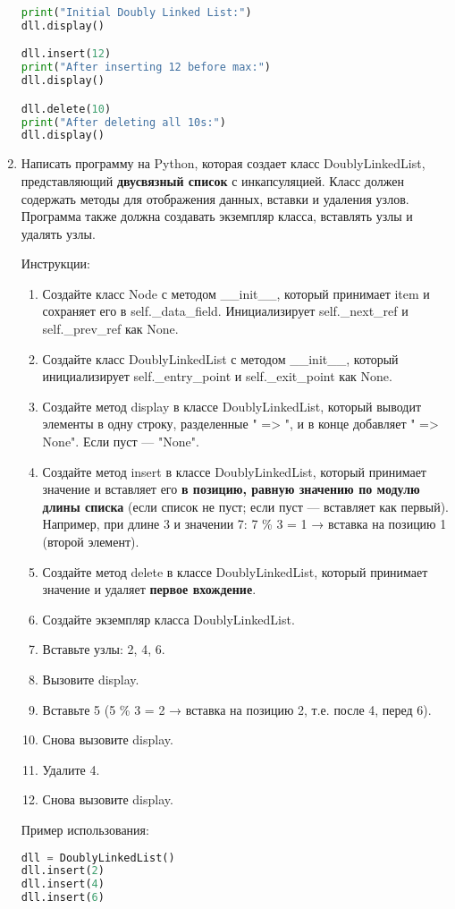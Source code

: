 \begin{enumerate}
\begin{lstlisting}[language=Python]
print("Initial Doubly Linked List:")
dll.display()

dll.insert(12)
print("After inserting 12 before max:")
dll.display()

dll.delete(10)
print("After deleting all 10s:")
dll.display()
\end{lstlisting}

\item Написать программу на Python, которая создает класс DoublyLinkedList, представляющий \textbf{двусвязный список} с инкапсуляцией. Класс должен содержать методы для отображения данных, вставки и удаления узлов. Программа также должна создавать экземпляр класса, вставлять узлы и удалять узлы.

Инструкции:
\begin{enumerate}
    \item Создайте класс Node с методом \_\_init\_\_, который принимает item и сохраняет его в self.\_data\_field. Инициализирует self.\_next\_ref и self.\_prev\_ref как None.
    \item Создайте класс DoublyLinkedList с методом \_\_init\_\_, который инициализирует self.\_entry\_point и self.\_exit\_point как None.
    \item Создайте метод display в классе DoublyLinkedList, который выводит элементы в одну строку, разделенные " => ", и в конце добавляет " => None". Если пуст — "None".
    \item Создайте метод insert в классе DoublyLinkedList, который принимает значение и вставляет его \textbf{в позицию, равную значению по модулю длины списка} (если список не пуст; если пуст — вставляет как первый). Например, при длине 3 и значении 7: 7 \% 3 = 1 → вставка на позицию 1 (второй элемент).
    \item Создайте метод delete в классе DoublyLinkedList, который принимает значение и удаляет \textbf{первое вхождение}.
    \item Создайте экземпляр класса DoublyLinkedList.
    \item Вставьте узлы: 2, 4, 6.
    \item Вызовите display.
    \item Вставьте 5 (5 \% 3 = 2 → вставка на позицию 2, т.е. после 4, перед 6).
    \item Снова вызовите display.
    \item Удалите 4.
    \item Снова вызовите display.
\end{enumerate}

Пример использования:
\begin{lstlisting}[language=Python]
dll = DoublyLinkedList()
dll.insert(2)
dll.insert(4)
dll.insert(6)


\end{lstlisting}
\end{enumerate}
